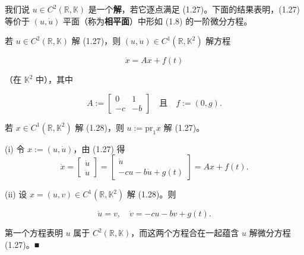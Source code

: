 我们说 $ u \in C^{2}(\mathbb{R}, \mathbb{K}) $ 是一个\textbf{解}，若它逐点满足 (1.27)。下面的结果表明，(1.27) 等价于 $ (u,\dot{u}) $ 平面（称为\textbf{相平面}）中形如 (1.8) 的一阶微分方程。

\begin{lemma}

\begin{subitems}
\item

若 $ u \in C^{2}(\mathbb{R}, \mathbb{K}) $ 解 (1.27)，则 $ (u,\dot{u}) \in C^{1}(\mathbb{R}, \mathbb{K}^{2}) $ 解方程

\begin{equation}
\dot{x} = Ax + f(t)\tag{1.28}
\end{equation}

（在 $ \mathbb{K}^{2} $ 中），其中

\begin{equation}
A := \begin{bmatrix} 0 & 1 \\ -c & -b \end{bmatrix} \quad \text{且} \quad f := (0,g) .\tag{1.29}
\end{equation}
\item

若 $ x \in C^{1}(\mathbb{R}, \mathbb{K}^{2}) $ 解 (1.28)，则 $ u := \mathrm{pr}_{1}x $ 解 (1.27)。

\proofhead
(i) 令 $ x := (u,\dot{u}) $，由 (1.27) 得
\begin{equation*}
\dot{x} = \begin{bmatrix} \dot{u} \\ \ddot{u} \end{bmatrix} = \begin{bmatrix} \dot{u} \\ -cu - b\dot{u} + g(t) \end{bmatrix} = Ax + f(t) .
\end{equation*}
\end{subitems}

(ii) 设 $ x = (u,v) \in C^{1}(\mathbb{R}, \mathbb{K}^{2}) $ 解 (1.28)。则

\begin{equation}
\dot{u} = v , \quad \dot{v} = -cu - bv + g(t) .\tag{1.30}
\end{equation}

第一个方程表明 $ u $ 属于 $ C^{2}(\mathbb{R}, \mathbb{K}) $，而这两个方程合在一起蕴含 $ u $ 解微分方程 (1.27)。\nobreak\hspace{0.35em}■

\end{lemma}

